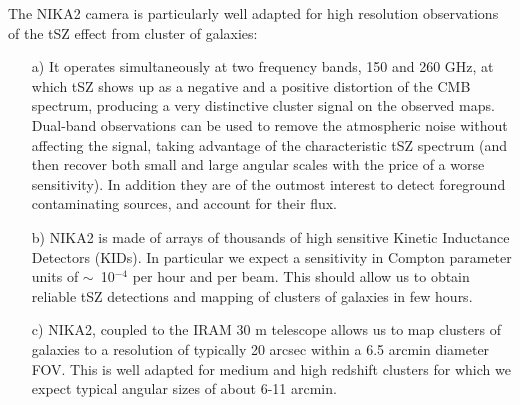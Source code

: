 \documentclass[11pt,a4paper,twoside,graphicx,color]{article}
\begin{document}
\vspace{0.3cm}  
The NIKA2 camera is particularly well adapted for high resolution observations of the tSZ effect from cluster of galaxies:
\begin{itemize}
\item [a)] It operates simultaneously at two frequency bands, 150 and 260 GHz, at which tSZ shows up as a negative and a positive distortion of the CMB spectrum, producing a very distinctive cluster signal on the observed maps. Dual-band observations can be used to remove the atmospheric noise without affecting the signal, taking advantage of the characteristic tSZ spectrum (and then recover both small  and large angular scales with the price of a worse sensitivity). In addition they are of the outmost interest to detect foreground contaminating sources, and account for their flux.
\item [b)] NIKA2 is made of arrays of thousands of high sensitive Kinetic Inductance Detectors (KIDs). In particular we expect a sensitivity in Compton parameter units of $\sim$~10$^{-4}$ per hour and per beam. This should allow us to obtain reliable tSZ detections and mapping of clusters of galaxies in few hours.
\item [c)] NIKA2, coupled to the IRAM 30 m telescope allows us to map clusters of galaxies to a resolution of typically 20 arcsec within a 6.5 arcmin diameter FOV. This is well adapted for medium and high redshift clusters for which we expect typical angular sizes of about 6-11 arcmin. %
\end{itemize}
\end{document}
